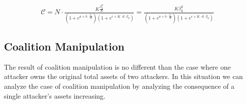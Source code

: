 \begin{align}
\mathcal{C} = N \cdot \frac{K \frac{\beta_0 ^2}{N}}{ (1+e^{a + b \cdot \frac{\beta_0}{N} }) (1+e^{c + K \cdot d \cdot \beta_0})} = \frac{K \beta_0 ^2 }{ (1+e^{a + b \cdot \frac{\beta_0}{N} }) (1+e^{c + K \cdot d \cdot \beta_0})}
\end{align}


\subsection{Coalition Manipulation \label{sec:coalition}}
The result of coalition manipulation is no different than the case where one attacker owns the original total assets of two attackers. In this situation we can analyze the case of coalition manipulation by analyzing the consequence of a single attacker's assets increasing.



